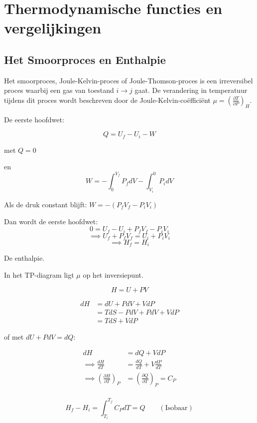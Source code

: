 \section{Thermodynamische functies en vergelijkingen}

\subsection{Het Smoorproces en Enthalpie}

Het smoorproces, Joule-Kelvin-proces of Joule-Thomson-proces
is een irreversibel proces waarbij een gas van toestand \(i \to j\) gaat.
De verandering in temperatuur tijdens dit proces wordt beschreven door de Joule-Kelvin-coëfficiënt $\mu = \left(\frac{\partial T}{\partial P}\right)_H$.

De eerste hoofdwet:

\[
Q = U_f - U_i - W
\]

met \(Q = 0\)

en
\[
W = - \int_{0}^{V_f} P_fdV - \int_{V_i}^{0} P_i dV
\]

Als de druk constant blijft: \(W = -(P_fV_f - P_iV_i)\)

Dan wordt de eerste hoofdwet:
\[
0 = U_f - U_i + P_fV_f-P_iV_i
\]
\[
\implies U_f + P_fV_f = U_i + P_iV_i
\]
\[
\implies H_f = H_i
\]

De enthalpie.

In het TP-diagram ligt \(\mu\) op het inversiepunt.

\begin{equation}
    \label{eq:enthalpie}
    H = U + PV
\end{equation}

\begin{align*}
dH &= dU + PdV + VdP \\
&= TdS - PdV  + PdV + VdP\\
&= TdS + VdP
\end{align*}

of met \(dU + PdV = dQ\):

\begin{align*}
dH &= dQ + VdP \\
\implies \frac{dH}{dT} &= \frac{dQ}{dT} + V\frac{dP}{dT} \\
\implies \left(\frac{\partial H}{\partial T}\right)_P &= \left(\frac{\partial Q}{\partial T}\right)_P= C_P \\
\end{align*}

\[H_f-H_i = \int_{T_i}^{T_f} C_P dT = Q \qquad (\text{Isobaar})\]

